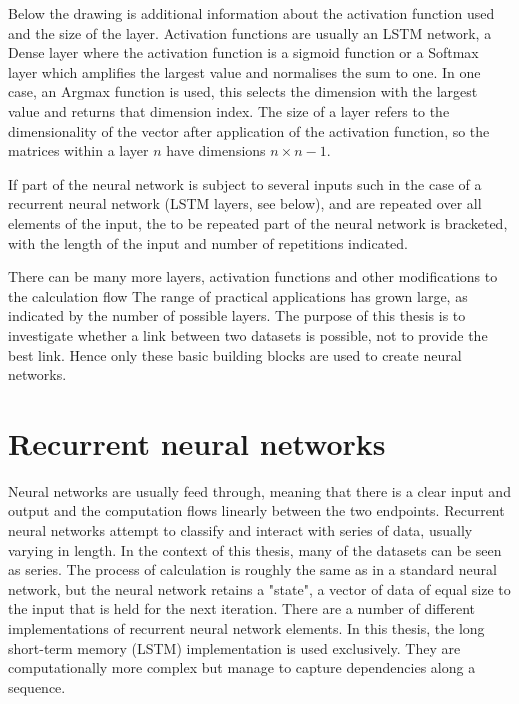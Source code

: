 \documentclass[10pt, a4paper]{UUThesisTemplate}
\begin{document}
Below the drawing is additional information about the activation function used and the size of the layer. Activation functions are usually an LSTM network, a Dense layer where the activation function is a sigmoid function or a Softmax layer which amplifies the largest value and normalises the sum to one. In one case, an Argmax function is used, this selects the dimension with the largest value and returns that dimension index. The size of a layer refers to the dimensionality of the vector after application of the activation function, so the matrices within a layer $n$ have dimensions $n\times n-1$.

If part of the neural network is subject to several inputs such in the case of a recurrent neural network (LSTM layers, see below), and are repeated over all elements of the input, the to be repeated part of the neural network is bracketed, with the length of the input and number of repetitions indicated.

There can be many more layers, activation functions and other modifications to the calculation flow \cite{Keras} The range of practical applications has grown large, as indicated by the number of possible layers. The purpose of this thesis is to investigate whether a link between two datasets is possible, not to provide the best link. Hence only these basic building blocks are used to create neural networks.

\section{Recurrent neural networks}\label{sec:LSTM}

Neural networks are usually feed through, meaning that there is a clear input and output and the computation flows linearly between the two endpoints. Recurrent neural networks attempt to classify and interact with series of data, usually varying in length. In the context of this thesis, many of the datasets can be seen as series. The process of calculation is roughly the same as in a standard neural network, but the neural network retains a "state", a vector of data of equal size to the input that is held for the next iteration. There are a number of different implementations of recurrent neural network elements. In this thesis, the long short-term memory (LSTM) \cite{Hofreiter97} implementation is used exclusively. They are computationally more complex but manage to capture dependencies along a sequence.
\end{document}
